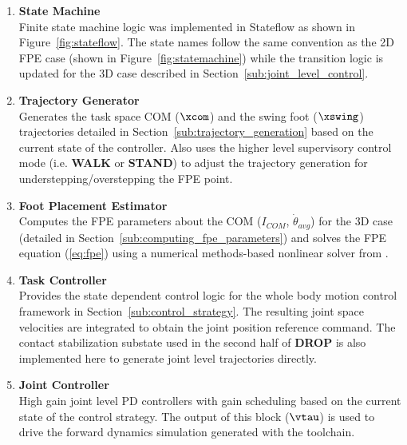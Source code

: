 \begin{enumerate}
	\item \textbf{State Machine} \\ 
	Finite state machine logic was implemented in Stateflow as shown in Figure~\ref{fig:stateflow}. The state names follow the same convention as the 2D FPE case (shown in Figure~\ref{fig:statemachine}) while the transition logic is updated for the 3D case described in Section~\ref{sub:joint_level_control}.  \\

	\item \textbf{Trajectory Generator} \\ 
	Generates the task space COM ($\xcom$) and the swing foot ($\xswing$) trajectories detailed in Section~\ref{sub:trajectory_generation} based on the current state of the controller. Also uses the higher level supervisory control mode (i.e. \textbf{WALK} or \textbf{STAND}) to adjust the trajectory generation for understepping/overstepping the FPE point. \\

	\item \textbf{Foot Placement Estimator} \\ 
	Computes the FPE parameters about the COM ($I_{COM}$, $\dot{\theta}_{avg}$) for the 3D case (detailed in Section~\ref{sub:computing_fpe_parameters}) and solves the FPE equation (\ref{eq:fpe}) using a numerical methods-based nonlinear solver from \cite{Wight:2008vt}. \\

	\item \textbf{Task Controller} \\ 
	Provides the state dependent control logic for the whole body motion control framework in Section~\ref{sub:control_strategy}. The resulting joint space velocities are integrated to obtain the joint position reference command. The contact stabilization substate used in the second half of \textbf{DROP} is also implemented here to generate joint level trajectories directly. \\

	\item \textbf{Joint Controller} \\ 
	High gain joint level PD controllers with gain scheduling based on the current state of the control strategy. The output of this block ($\vtau$) is used to drive the forward dynamics simulation generated with the toolchain. \\

\end{enumerate}

